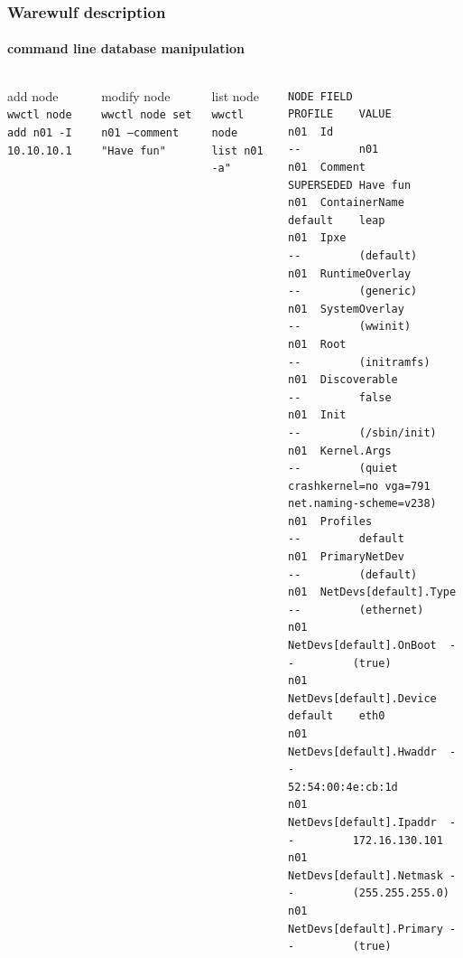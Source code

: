 \documentclass[aspectratio=169]{beamer}
\begin{document}
\begin{frame}[fragile]
\frametitle{Warewulf description}
\framesubtitle{command line database manipulation}
\begin{columns}
\begin{block}{add node}
\texttt{wwctl node add n01 -I 10.10.10.1}
\end{block}
\begin{block}{modify node}
\texttt{wwctl node set n01 --comment "Have fun"}
\end{block}
\begin{block}{list node}
\texttt{wwctl node list n01 -a"}
\end{block}
\vspace*{3cm}
\begin{lstlisting}[style=mystyle]
NODE FIELD                    PROFILE    VALUE
n01  Id                       --         n01
n01  Comment                  SUPERSEDED Have fun
n01  ContainerName            default    leap
n01  Ipxe                     --         (default)
n01  RuntimeOverlay           --         (generic)
n01  SystemOverlay            --         (wwinit)
n01  Root                     --         (initramfs)
n01  Discoverable             --         false
n01  Init                     --         (/sbin/init)
n01  Kernel.Args              --         (quiet crashkernel=no vga=791 net.naming-scheme=v238)
n01  Profiles                 --         default
n01  PrimaryNetDev            --         (default)
n01  NetDevs[default].Type    --         (ethernet)
n01  NetDevs[default].OnBoot  --         (true)
n01  NetDevs[default].Device  default    eth0
n01  NetDevs[default].Hwaddr  --         52:54:00:4e:cb:1d
n01  NetDevs[default].Ipaddr  --         172.16.130.101
n01  NetDevs[default].Netmask --         (255.255.255.0)
n01  NetDevs[default].Primary --         (true)
\end{lstlisting}
\end{columns}
\end{frame}
%
%
%
%
\end{document}
